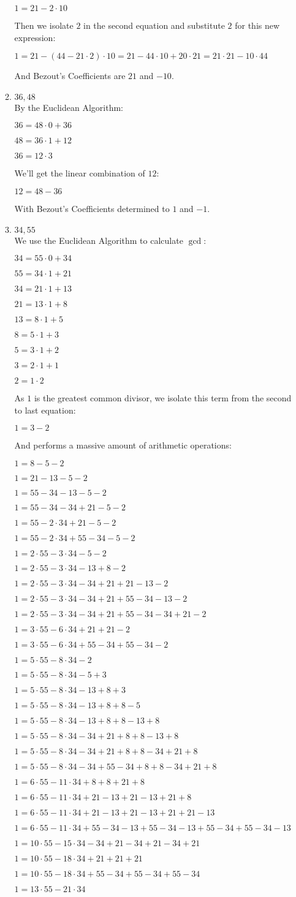 \documentclass{report}
\newcommand{\cent}[1]{\begin{center}#1\end{center}}
\newcommand{\defaultEnumerateLabel}{\textbf{\alph*.}}
\newcommand{\myItem}[1]{\item #1\\}
\begin{document}
\begin{enumerate}[label=\defaultEnumerateLabel]
\begin{enumerate}[label=\defaultEnumerateLabel]
		\cent{$1 = 21 - 2 \cdot 10 $}
		
		Then we isolate $2$ in the second equation and substitute $2$ for this new expression:
		
		\cent{$1 = 21 - (44 - 21 \cdot 2) \cdot 10 = 21 - 44 \cdot 10 + 20 \cdot 21 = 21\cdot 21 - 10 \cdot 44 $}
		
		And Bezout's Coefficients are $21$ and $-10$.\\
		
		\myItem{$36, 48$}
		
		By the Euclidean Algorithm:
		
		\cent{$36 = 48 \cdot 0 + 36$}
		\cent{$48 = 36 \cdot 1 + 12$}
		\cent{$36 = 12 \cdot 3$}
		
		We'll get the linear combination of $12$:
		
		\cent{$12 = 48 - 36$}
		
		With Bezout's Coefficients determined to $1$ and $-1$.
		
		\myItem{$34,55$}
		
		We use the Euclidean Algorithm to calculate $\gcd$:
		
		\cent{$34 = 55 \cdot 0 + 34$}
		\cent{$55 =  34 \cdot 1 + 21$}
		\cent{$34 = 21 \cdot 1 + 13$}
		\cent{$21 = 13 \cdot 1 + 8$}
		\cent{$13 = 8 \cdot 1 + 5$}
		\cent{$8 = 5 \cdot 1 + 3$}
		\cent{$5 = 3 \cdot 1 + 2$}
		\cent{$3 = 2 \cdot 1 + 1$}
		\cent{$2 = 1 \cdot 2 $}
		As $1$ is the greatest common divisor, we isolate this term from the second to last equation:
		\cent{$1 = 3 -2$}
		
		And performs a massive amount of arithmetic operations:
		\cent{$1 = 8-5 -2$}
		\cent{$1 = 21-13-5 -2$}
		\cent{$1 = 55-34-13-5 -2$}
		\cent{$1 = 55-34-34+ 21-5 -2$}
		\cent{$1 = 55-2 \cdot 34+21-5 -2$}
		\cent{$1 = 55-2 \cdot 34+55-34-5 -2$}
		\cent{$1 = 2 \cdot 55-3 \cdot 34-5-2$}
		\cent{$1 = 2 \cdot 55-3 \cdot 34-13+8-2$}
		\cent{$1 = 2 \cdot 55-3 \cdot 34-34+21+21-13-2$}
		\cent{$1 = 2 \cdot 55-3 \cdot 34-34+21+55-34-13-2$}
		\cent{$1 = 2 \cdot 55-3 \cdot 34-34+21+55-34-34+21-2$}
		\cent{$1 = 3 \cdot 55-6 \cdot 34+21+21-2$}
		\cent{$1 = 3 \cdot 55-6 \cdot 34+55-34+55-34-2$}
		\cent{$1 = 5 \cdot 55-8 \cdot 34-2$}
		\cent{$1 = 5 \cdot 55-8 \cdot 34-5+3$}
		\cent{$1 = 5 \cdot 55-8 \cdot 34-13+8+3$}
		\cent{$1 = 5 \cdot 55-8 \cdot 34-13+8+8-5$}
		\cent{$1 = 5 \cdot 55-8 \cdot 34-13+8+8-13+8$}
		\cent{$1 = 5 \cdot 55-8 \cdot 34-34+21+8+8-13+8$}
		\cent{$1 = 5 \cdot 55-8 \cdot 34-34+21+8+8-34+21+8$}
		\cent{$1 = 5 \cdot 55-8 \cdot 34-34+55-34+8+8-34+21+8$}
		\cent{$1 = 6 \cdot 55-11 \cdot 34+8+8+21+8$}
		\cent{$1 = 6 \cdot 55-11 \cdot 34+21-13+21-13+21+8$}
		\cent{$1 = 6 \cdot 55-11 \cdot 34+21-13+21-13+21+21-13$}
		\cent{$1 = 6 \cdot 55-11 \cdot 34+55-34-13+55-34-13+55-34+55-34-13$}
		\cent{$1 = 10 \cdot 55-15 \cdot 34-34+21-34+21-34+21$}
		\cent{$1 = 10 \cdot 55-18 \cdot 34+21+21+21$}
		\cent{$1 = 10 \cdot 55-18 \cdot 34+55-34+55-34+55-34$}
		\cent{$1 = 13 \cdot 55-21 \cdot 34$}
		

\end{enumerate}
\end{enumerate}
\end{document}
